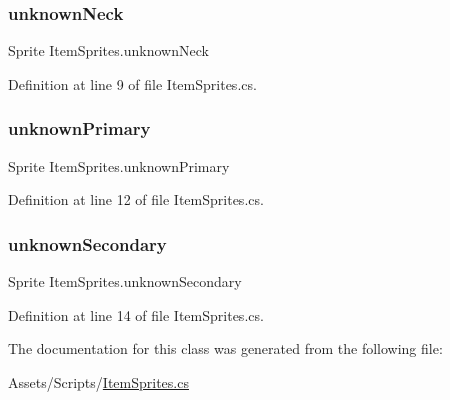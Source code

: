\subsubsection{\texorpdfstring{unknownNeck}{unknownNeck}}
{\footnotesize\ttfamily Sprite Item\+Sprites.\+unknown\+Neck}



Definition at line 9 of file Item\+Sprites.\+cs.

\mbox{\label{class_item_sprites_a492900f0ec1e48269f947ad33c2edd8c}} 
\subsubsection{\texorpdfstring{unknownPrimary}{unknownPrimary}}
{\footnotesize\ttfamily Sprite Item\+Sprites.\+unknown\+Primary}



Definition at line 12 of file Item\+Sprites.\+cs.

\mbox{\label{class_item_sprites_a5ef9da17a7a9a1cdb3512af435693f15}} 
\subsubsection{\texorpdfstring{unknownSecondary}{unknownSecondary}}
{\footnotesize\ttfamily Sprite Item\+Sprites.\+unknown\+Secondary}



Definition at line 14 of file Item\+Sprites.\+cs.



The documentation for this class was generated from the following file\+:\begin{DoxyCompactItemize}
\item 
Assets/\+Scripts/\mbox{\hyperlink{_item_sprites_8cs}{Item\+Sprites.\+cs}}\end{DoxyCompactItemize}

